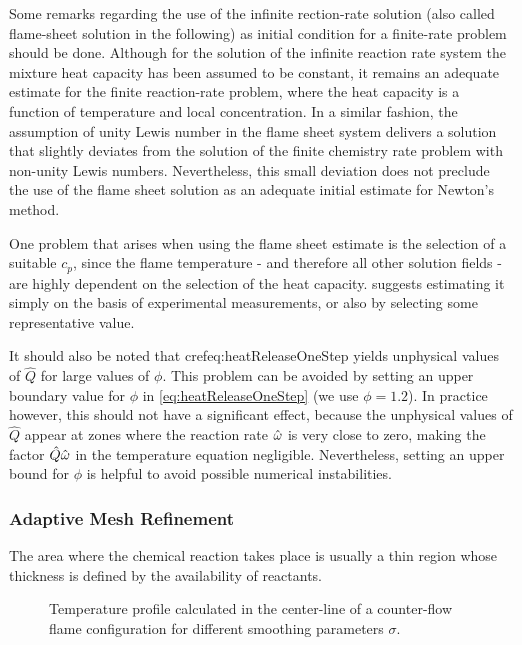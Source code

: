 Some remarks regarding the use of the infinite rection-rate solution (also called flame-sheet solution in the following) as initial condition for a finite-rate problem should be done. Although for the solution of the infinite reaction rate system the mixture heat capacity has been assumed to be constant, it remains an adequate estimate for the finite reaction-rate problem, where the heat capacity is a function of temperature and local concentration. In a similar fashion, the assumption of unity Lewis number in the flame sheet system delivers a solution that slightly deviates from the solution of the finite chemistry rate problem with non-unity Lewis numbers. Nevertheless, this small deviation does not preclude the use of the flame sheet solution as an adequate initial estimate for Newton's method. 

One problem that arises when using the flame sheet estimate is the selection of a suitable $c_p$, since the flame temperature - and therefore all other solution fields - are highly dependent on the selection of the heat capacity. \cite{xuApplicationPrimitiveVariable1993} suggests estimating it simply on the basis of experimental measurements, or also by selecting some representative value.

It should also be noted that cref{eq:heatReleaseOneStep} yields unphysical values of $\hat Q$ for large values of $\phi$. This problem can be avoided by setting an upper boundary value for $\phi$ in \cref{eq:heatReleaseOneStep} (we use $\phi = 1.2$). In practice however, this should not have a significant effect, because the unphysical values of $\hat Q$ appear at zones where the reaction rate $\hat{\omega}$ is very close to zero, making the factor $\hat Q \hat{\omega}$ in the temperature equation negligible. Nevertheless, setting an upper bound for $\phi$ is helpful to avoid possible numerical instabilities.

\subsubsection{Adaptive Mesh Refinement}\label{ssec:MeshRefinement}
The area where the chemical reaction takes place is usually a thin region whose thickness is defined by the availability of reactants.
\begin{figure}
	\centering
	\caption{Temperature profile calculated in the center-line of a counter-flow flame configuration for different smoothing parameters $\sigma$.}
	\label{fig:smoothings}
\end{figure}
